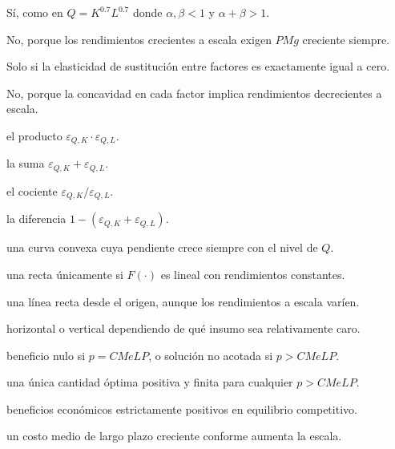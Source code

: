 \begin{opts}
    \item Sí, como en $Q = K^{0.7}L^{0.7}$ donde $\alpha, \beta < 1$ y $\alpha+\beta > 1$.
    \item No, porque los rendimientos crecientes a escala exigen $PMg$ creciente siempre.
    \item Solo si la elasticidad de sustitución entre factores es exactamente igual a cero.
    \item No, porque la concavidad en cada factor implica rendimientos decrecientes a escala.
\end{opts}

\begin{opts}
    \item el producto $\varepsilon_{Q,K} \cdot \varepsilon_{Q,L}$.
    \item la suma $\varepsilon_{Q,K} + \varepsilon_{Q,L}$.
    \item el cociente $\varepsilon_{Q,K} / \varepsilon_{Q,L}$.
    \item la diferencia $1 - (\varepsilon_{Q,K} + \varepsilon_{Q,L})$.
\end{opts}

\begin{opts}
    \item una curva convexa cuya pendiente crece siempre con el nivel de $Q$.
    \item una recta únicamente si $F(\cdot)$ es lineal con rendimientos constantes.
    \item una línea recta desde el origen, aunque los rendimientos a escala varíen.
    \item horizontal o vertical dependiendo de qué insumo sea relativamente caro.
\end{opts}

\begin{opts}
    \item beneficio nulo si $p = CMeLP$, o solución no acotada si $p > CMeLP$.
    \item una única cantidad óptima positiva y finita para cualquier $p > CMeLP$.
    \item beneficios económicos estrictamente positivos en equilibrio competitivo.
    \item un costo medio de largo plazo creciente conforme aumenta la escala.
\end{opts}

